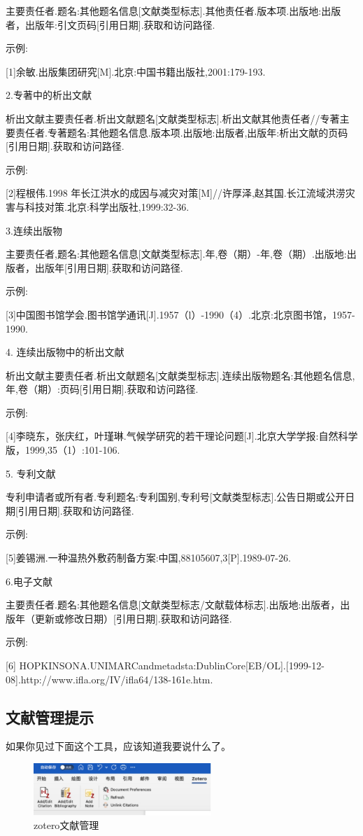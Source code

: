 \documentclass[12pt,a4paper]{ctexart}
\begin{document}
主要责任者.题名:其他题名信息[文献类型标志].其他责任者.版本项.出版地:出版者，出版年:引文页码[引用日期].获取和访问路径.

示例:

[1]余敏.出版集团研究[M].北京:中国书籍出版社,2001:179-193.

2.专著中的析出文献

析出文献主要责任者.析出文献题名[文献类型标志].析出文献其他责任者//专著主要责任者.专著题名:其他题名信息.版本项.出版地:出版者,出版年:析出文献的页码[引用日期].获取和访问路径.

示例:

[2]程根伟.1998 年长江洪水的成因与减灾对策[M]//许厚泽,赵其国.长江流域洪涝灾害与科技对策.北京:科学出版社,1999:32-36.

3.连续出版物

主要责任者,题名:其他题名信息[文献类型标志].年,卷（期）-年,卷（期）.出版地:出版者，出版年[引用日期].获取和访问路径.

示例:

[3]中国图书馆学会.图书馆学通讯[J].1957（l）-1990（4）.北京:北京图书馆，1957-1990.

4. 连续出版物中的析出文献

析出文献主要责任者.析出文献题名[文献类型标志].连续出版物题名:其他题名信息,年,卷（期）:页码[引用日期].获取和访问路径.

示例:

[4]李晓东，张庆红，叶瑾琳.气候学研究的若干理论问题[J].北京大学学报:自然科学版，1999,35（1）:101-106.

5. 专利文献

专利申请者或所有者.专利题名:专利国别,专利号[文献类型标志].公告日期或公开日期[引用日期].获取和访问路径.

示例:

[5]姜锡洲.一种温热外敷药制备方案:中国,88105607,3[P].1989-07-26.

6.电子文献

主要责任者.题名:其他题名信息[文献类型标志/文献载体标志].出版地:出版者，出版年（更新或修改日期）[引用日期].获取和访问路径.

示例:

[6]	HOPKINSONA.UNIMARCandmetadsta:DublinCore[EB/OL].[1999-12-08].http://www.ifla.org/IV/ifla64/138-161e.htm.
\subsection{文献管理提示}
如果你见过下面这个工具，应该知道我要说什么了。

\begin{figure}[h]
    \centering
    \includegraphics[width=0.6\textwidth]{2.png}
    \caption{zotero文献管理}
    \label{fig:zotero}
    \end{figure}
\end{document}
